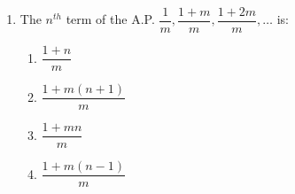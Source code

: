 \begin{enumerate}[label=(\roman*)]
        \begin{multicols}{2}
        \begin{enumerate}[label=(\alph*)]
            \item 2 
            \item $\dfrac19$ 
            \item $\dfrac83$ 
            \item 1 
        \end{enumerate}
        \end{multicols}

    \item The $n^{th}$ term of the A.P. $\dfrac{1}{m}, \dfrac{1+m}{m}, 
        \dfrac{1+2m}{m}, \dots$ is:

        \begin{multicols}{2}
        \begin{enumerate}[label=(\alph*)]
            \item $\dfrac{1+n}{m}$ 
            \item $\dfrac{1+m(n+1)}{m}$ 
            \item $\dfrac{1+mn}{m}$ 
            \item $\dfrac{1+m(n-1)}{m}$ 
        \end{enumerate}
        \end{multicols}

\end{enumerate}

